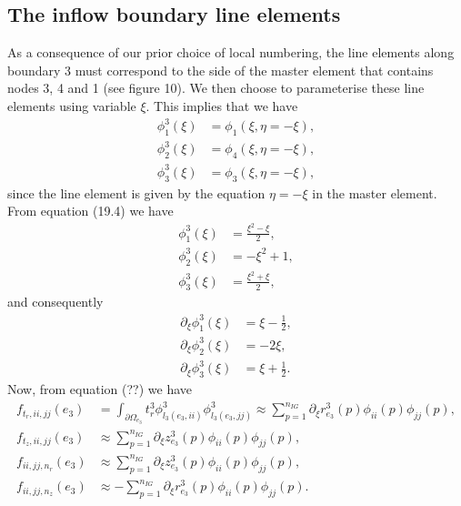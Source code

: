 \documentclass{article}
\begin{document}
\subsection{The inflow boundary line elements}
As a consequence of our prior choice of local numbering, the line elements along boundary 3 must correspond to the side of the master element that contains nodes 3, 4 and 1 (see figure 10). We then choose to parameterise these line elements using variable \(\xi\). This implies that we have
\begin{align}
\phi_1^3(\xi) &= \phi_1(\xi,\eta=-\xi), \tag{21.64}\\
\phi_2^3(\xi) &= \phi_4(\xi,\eta=-\xi), \tag{21.65}\\
\phi_3^3(\xi) &= \phi_3(\xi,\eta=-\xi), \tag{21.66}
\end{align}
since the line element is given by the equation \(\eta=-\xi\) in the master element.
From equation (19.4) we have
\begin{align}
\phi_1^3(\xi) &= \frac{\xi^2 - \xi}{2}, \tag{21.68}\\
\phi_2^3(\xi) &= -\xi^2 + 1, \tag{21.70}\\
\phi_3^3(\xi) &= \frac{\xi^2 + \xi}{2}, \tag{21.71}
\end{align}
and consequently
\begin{align}
\partial_\xi \phi_1^3(\xi) &= \xi - \frac12, \tag{21.72}\\
\partial_\xi \phi_2^3(\xi) &= -2\xi, \tag{21.73}\\
\partial_\xi \phi_3^3(\xi) &= \xi + \frac12. \tag{21.74}
\end{align}
Now, from equation (??) we have
\begin{align}
f_{t_r,ii,jj}(e_3) &= \int_{\partial\Omega_{e_3}} t_r^3 \phi_{l_3(e_3,ii)}^3 \phi_{l_3(e_3,jj)}^3 \approx \sum_{p=1}^{n_{IG}} \partial_\xi r_{e_3}^3(p) \phi_{ii}(p) \phi_{jj}(p), \tag{21.81}\\
f_{t_z,ii,jj}(e_3) &\approx \sum_{p=1}^{n_{IG}} \partial_\xi z_{e_3}^3(p) \phi_{ii}(p) \phi_{jj}(p), \tag{21.84}\\
f_{ii,jj,n_r}(e_3) &\approx \sum_{p=1}^{n_{IG}} \partial_\xi z_{e_3}^3(p) \phi_{ii}(p) \phi_{jj}(p), \tag{21.88}\\
f_{ii,jj,n_z}(e_3) &\approx -\sum_{p=1}^{n_{IG}} \partial_\xi r_{e_3}^3(p) \phi_{ii}(p) \phi_{jj}(p). \tag{21.91}
\end{align}
\end{document}
